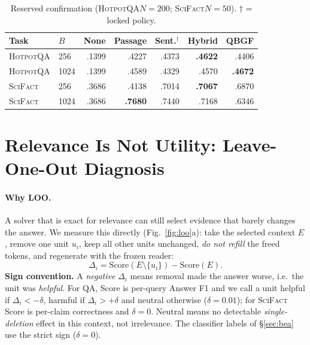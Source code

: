 \documentclass[10pt,twocolumn,letterpaper]{article}
\newcommand{\hotpot}{\textsc{HotpotQA}\xspace}
\newcommand{\scifact}{\textsc{SciFact}\xspace}
\newcommand{\SmallTable}{\footnotesize\setlength{\tabcolsep}{3.6pt}}
\begin{document}
\begin{table}[t]\centering\SmallTable
\caption{Reserved confirmation (\hotpot $N{=}200$; \scifact $N{=}50$). $\dagger$ = locked policy.}\label{tab:conf}
\begin{tabular}{llrrrrr}\toprule
Task & $B$ & None & Passage & Sent.$^\dagger$ & Hybrid & QBGF\\\midrule
\hotpot & 256 & .1399 & .4227 & .4373 & \textbf{.4622} & .4406\\
\hotpot & 1024 & .1399 & .4589 & .4329 & .4570 & \textbf{.4672}\\
\scifact & 256 & .3686 & .4138 & .7014 & \textbf{.7067} & .6870\\
\scifact & 1024 & .3686 & \textbf{.7680} & .7440 & .7168 & .6346\\\bottomrule
\end{tabular}\end{table}

\section{Relevance Is Not Utility: Leave-One-Out Diagnosis}\label{sec:loo}
\paragraph{Why LOO.} A solver that is exact for relevance can still select evidence that barely changes the answer. We measure this directly (Fig.~\ref{fig:loo}a): take the selected context $E$, remove one unit $u_i$, keep all other units unchanged, \emph{do not refill} the freed tokens, and regenerate with the frozen reader:
\begin{equation}
\Delta_i=\mathrm{Score}(E\setminus\{u_i\})-\mathrm{Score}(E).\label{eq:loo}
\end{equation}
\textbf{Sign convention.} A \emph{negative} $\Delta_i$ means removal made the answer worse, i.e.\ the unit was \emph{helpful}. For QA, Score is per-query Answer F1 and we call a unit helpful if $\Delta_i<-\delta$, harmful if $\Delta_i>+\delta$ and neutral otherwise ($\delta{=}0.01$); for \scifact Score is per-claim correctness and $\delta{=}0$. Neutral means no detectable \emph{single-deletion} effect in this context, not irrelevance. The classifier labels of \S\ref{sec:bea} use the strict sign ($\delta{=}0$).
\end{document}
